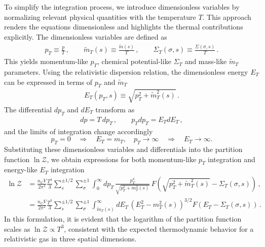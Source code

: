 \documentclass[epjST]{svjour}
\begin{document}
To simplify the integration process, we introduce dimensionless variables by normalizing relevant physical quantities with the temperature \( T \). This approach renders the equations dimensionless and highlights the thermal contributions explicitly. The dimensionless variables are defined as
\begin{align}
\label{eq:dimensionless_variables}
p_{T} \equiv \frac{p}{T}\,, \qquad \tilde{m}_{T}(s) \equiv \frac{\tilde{m}(s)}{T}\,, \qquad \Sigma_{T}(\sigma,s) \equiv \frac{\Sigma(\sigma,s)}{T}\,.
\end{align}
This yields momentum-like \(p_{T}\), chemical potential-like \(\Sigma_{T}\) and mass-like \(\tilde{m}_{T}\) parameters. Using the relativistic dispersion relation, the dimensionless energy \(E_{T}\) can be expressed in terms of \(p_{T}\) and \(\tilde{m}_{T}\)
\begin{align}
E_{T}(p_{T},s) \equiv \sqrt{p_{T}^{2} + \tilde{m}_{T}^{2}(s)}\,.
\end{align}
The differential \( dp_{T} \) and \( dE_{T} \) transform as
\begin{align}
dp = T \, dp_{T}\,,\qquad p_{T}dp_{T} = E_{T} dE_{T}\,,
\end{align}
and the limits of integration change accordingly
\begin{equation}
p_{T} = 0 \quad \Rightarrow \quad E_{T} = m_{T}, \quad p_{T} \to \infty \quad \Rightarrow \quad E_{T} \to \infty.
\end{equation}
Substituting these dimensionless variables and differentials into the partition function \( \ln\mathcal{Z} \), we obtain expressions for both momentum-like \(p_{T}\) integration and energy-like \(E_{T}\) integration
\begin{align}
\label{eq:dimensionless_partition}
\ln\mathcal{Z} 
&= \frac{n_\mathrm{C} V}{2\pi^{2}} \frac{T^{3}}{3} \sum_{s}^{\pm1/2}\sum_{\sigma}^{\pm1} \int_{0}^{\infty} dp_{T} \, \frac{p_{T}^{4}}{\sqrt{p_{T}^{2} + m_{T}^{2}(s)}} \, F\left(\sqrt{p_{T}^{2} + \tilde{m}_{T}^{2}(s)} - \Sigma_{T}(\sigma,s)\right)\,,\\
\label{eq:dimensionless_partition2}
&= \frac{n_\mathrm{C} V}{2\pi^{2}} \frac{T^{3}}{3} \sum_{s}^{\pm1/2}\sum_{\sigma}^{\pm1} \int_{\tilde{m}_{T}(s)}^{\infty} dE_{T} \, (E_{T}^2-m_{T}^{2}(s))^{3/2} F\left(E_{T} - \Sigma_{T}(\sigma,s)\right)\,.
\end{align}
In this formulation, it is evident that the logarithm of the partition function scales as \( \ln\mathcal{Z} \propto T^{3} \), consistent with the expected thermodynamic behavior for a relativistic gas in three spatial dimensions.
\end{document}

